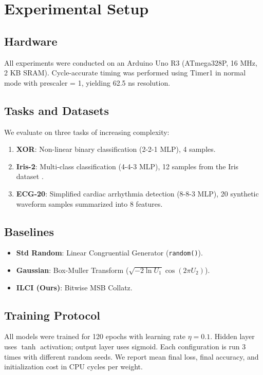 \documentclass[conference]{IEEEtran}
\begin{document}
\section{Experimental Setup}

\subsection{Hardware}
All experiments were conducted on an Arduino Uno R3 (ATmega328P, 16 MHz, 2 KB SRAM). Cycle-accurate timing was performed using Timer1 in normal mode with prescaler = 1, yielding 62.5 ns resolution.

\subsection{Tasks and Datasets}
We evaluate on three tasks of increasing complexity:
\begin{enumerate}
\item \textbf{XOR}: Non-linear binary classification (2-2-1 MLP), 4 samples.
\item \textbf{Iris-2}: Multi-class classification (4-4-3 MLP), 12 samples from the Iris dataset \cite{fisher1936iris}.
\item \textbf{ECG-20}: Simplified cardiac arrhythmia detection (8-8-3 MLP), 20 synthetic waveform samples summarized into 8 features.
\end{enumerate}

\subsection{Baselines}
\begin{itemize}
\item \textbf{Std Random}: Linear Congruential Generator (\texttt{random()}).
\item \textbf{Gaussian}: Box-Muller Transform ($\sqrt{-2 \ln U_1} \cos(2\pi U_2)$).
\item \textbf{ILCI (Ours)}: Bitwise MSB Collatz.
\end{itemize}

\subsection{Training Protocol}
All models were trained for 120 epochs with learning rate $\eta = 0.1$. Hidden layer uses $\tanh$ activation; output layer uses sigmoid. Each configuration is run 3 times with different random seeds. We report mean final loss, final accuracy, and initialization cost in CPU cycles per weight.
\end{document}
